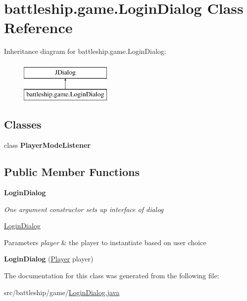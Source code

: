 \hypertarget{classbattleship_1_1game_1_1LoginDialog}{}\section{battleship.\+game.\+Login\+Dialog Class Reference}
\label{classbattleship_1_1game_1_1LoginDialog}
Inheritance diagram for battleship.\+game.\+Login\+Dialog\+:\begin{figure}[H]
\begin{center}
\leavevmode
\includegraphics[height=2.000000cm]{classbattleship_1_1game_1_1LoginDialog}
\end{center}
\end{figure}
\subsection*{Classes}
\begin{DoxyCompactItemize}
\item 
class {\bfseries Player\+Mode\+Listener}
\end{DoxyCompactItemize}
\subsection*{Public Member Functions}
\begin{Indent}{\bf Login\+Dialog}\par
{\em One argument constructor sets up interface of dialog

\hyperlink{classbattleship_1_1game_1_1LoginDialog}{Login\+Dialog}


\begin{DoxyParams}{Parameters}
{\em player} & the player to instantiate based on user choice \\
\hline
\end{DoxyParams}
}\begin{DoxyCompactItemize}
\item 
\hypertarget{classbattleship_1_1game_1_1LoginDialog_a5d1becf0c347e0d939bc2dc736b27818}{}{\bfseries Login\+Dialog} (\hyperlink{classbattleship_1_1game_1_1Player}{Player} player)\label{classbattleship_1_1game_1_1LoginDialog_a5d1becf0c347e0d939bc2dc736b27818}

\end{DoxyCompactItemize}
\end{Indent}


The documentation for this class was generated from the following file\+:\begin{DoxyCompactItemize}
\item 
src/battleship/game/\hyperlink{LoginDialog_8java}{Login\+Dialog.\+java}\end{DoxyCompactItemize}
